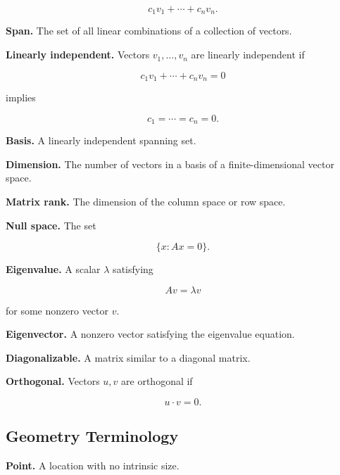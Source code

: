 \[
\boxed{
c_1v_1+\cdots+c_nv_n.
}
\]

\medskip

\textbf{Span.}
The set of all linear combinations of a collection of vectors.

\medskip

\textbf{Linearly independent.}
Vectors \(v_1,\ldots,v_n\) are linearly independent if

\[
c_1v_1+\cdots+c_nv_n=0
\]

implies

\[
\boxed{
c_1=\cdots=c_n=0.
}
\]

\medskip

\textbf{Basis.}
A linearly independent spanning set.

\medskip

\textbf{Dimension.}
The number of vectors in a basis of a finite-dimensional vector space.

\medskip

\textbf{Matrix rank.}
The dimension of the column space or row space.

\medskip

\textbf{Null space.}
The set

\[
\boxed{
\{x:Ax=0\}.
}
\]

\medskip

\textbf{Eigenvalue.}
A scalar \(\lambda\) satisfying

\[
\boxed{
Av=\lambda v
}
\]

for some nonzero vector \(v\).

\medskip

\textbf{Eigenvector.}
A nonzero vector satisfying the eigenvalue equation.

\medskip

\textbf{Diagonalizable.}
A matrix similar to a diagonal matrix.

\medskip

\textbf{Orthogonal.}
Vectors \(u,v\) are orthogonal if

\[
\boxed{
u\cdot v=0.
}
\]

\subsection{Geometry Terminology}
\label{subsec:geometry-terminology-reference}

\textbf{Point.}
A location with no intrinsic size.

